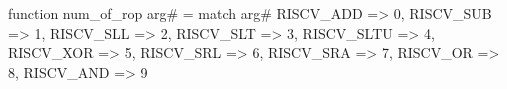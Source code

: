 function num_of_rop arg# = match arg# {
  RISCV_ADD => 0,
  RISCV_SUB => 1,
  RISCV_SLL => 2,
  RISCV_SLT => 3,
  RISCV_SLTU => 4,
  RISCV_XOR => 5,
  RISCV_SRL => 6,
  RISCV_SRA => 7,
  RISCV_OR => 8,
  RISCV_AND => 9
}
